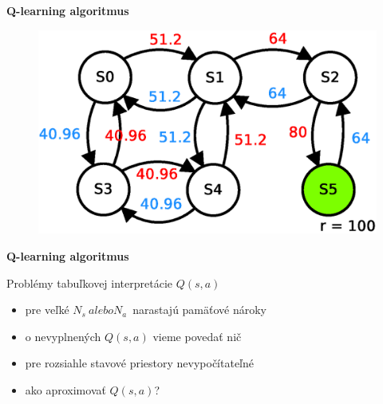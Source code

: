 \documentclass[xcolor=dvipsnames]{beamer}
\begin{document}
\begin{frame}{\bf Q-learning algoritmus}

\begin{figure}[!htb]
\includegraphics[scale=.5]{../diagrams/q_learning_table_06.eps}
\end{figure}

\end{frame}


\begin{frame}{\bf Q-learning algoritmus}

Problémy tabuľkovej interpretácie $Q(s, a)$

\begin{itemize}
\item pre veľké ${N_s}\  alebo  {N_a}$\ narastajú pamäťové nároky
\item o nevyplnených $Q(s, a)$ vieme povedať nič
\item pre rozsiahle stavové priestory nevypočítateľné
\item ako aproximovať $Q(s, a)$?
\end{itemize}

\end{frame}
\end{document}

